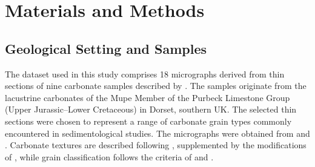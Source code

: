 \documentclass[a4paper,fleqn]{cas-dc}
\begin{document}
\section{Materials and Methods}

\subsection{Geological Setting and Samples}

The dataset used in this study comprises 18 micrographs derived from thin sections of nine carbonate samples described by \citet{gallois2016}. The samples originate from the lacustrine carbonates of the Mupe Member of the Purbeck Limestone Group (Upper Jurassic--Lower Cretaceous) in Dorset, southern UK. The selected thin sections were chosen to represent a range of carbonate grain types commonly encountered in sedimentological studies. The micrographs were obtained from \citet{gallois2016} and \citet{gallois2018}. Carbonate textures are described following \citet{dunham1962}, supplemented by the modifications of \citet{embry1971}, while grain classification follows the criteria of \citet{bathurst1971} and \citet{flugel2010}.
\end{document}
